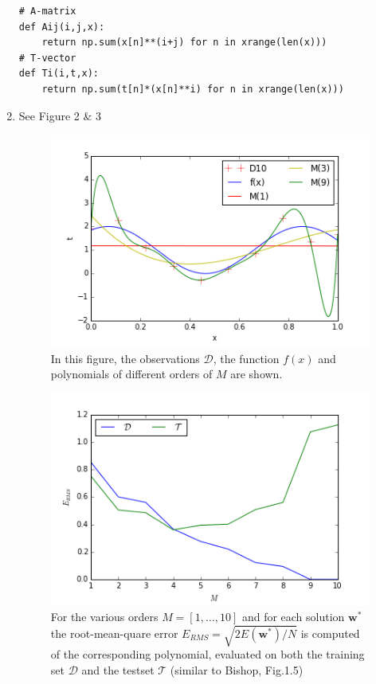 \documentclass[a4paper,11pt]{article}
\theoremstyle{mytheor}
\begin{document}
\begin{enumerate}
\begin{lstlisting}
# A-matrix
def Aij(i,j,x):
    return np.sum(x[n]**(i+j) for n in xrange(len(x)))
# T-vector
def Ti(i,t,x):
    return np.sum(t[n]*(x[n]**i) for n in xrange(len(x)))
		\end{lstlisting}
	\item See Figure 2 \& 3 \vspace{-0.2cm}
		\begin{figure}[h]
			\centering
			\includegraphics[scale=0.8]{1_2_10.png}\vspace{-0.5cm}
			\caption{\vspace{-0.2cm} In this figure, the observations $\mathcal{D}$, the function $f(x)$ and polynomials of different orders of $M$ are shown.}
		\end{figure}
		\vspace{-0.5cm}
		\begin{figure}[h]
			\centering
			\includegraphics[scale=0.8]{1_3_10.png}\vspace{-0.5cm}
			\caption{\vspace{-0.2cm} For the various orders $M = [1,\hdots,10]$ and for each solution $\boldsymbol{w}^*$ the root-mean-quare error $E_{RMS} = \sqrt{2E(\boldsymbol{w}^*)/N}$ is computed of the corresponding polynomial, evaluated on both the training set $\mathcal{D}$ and the testset $\mathcal{T}$ (similar to Bishop, Fig.1.5)}

\end{figure}
\end{enumerate}
\end{document}

